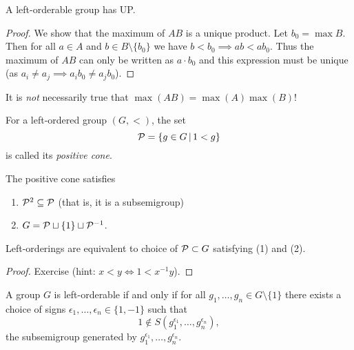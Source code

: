 \begin{proposition}
    A left-orderable group has UP.
\end{proposition}

\begin{proof}
    We show that the maximum of $AB$ is a unique product.
    Let $b_0 = \max B$.
    Then for all $a \in A$ and $b \in B \setminus \{b_0\}$ we have $b < b_0 \implies ab < ab_0$.
    Thus the maximum of $AB$ can only be written as $a \cdot b_0$ and this expression must be unique (as $a_i \neq a_j \implies a_i b_0 \neq a_j b_0$).
\end{proof}

\begin{remark}
    It is \emph{not} necessarily true that $\max(AB) = \max(A) \max(B)$!
\end{remark}

\begin{definition}
    For a left-ordered group $(G, <)$, the set \[
        \mathcal{P} = \left\{  g \in G  \,\middle|\,  1 < g  \right\}
    \] is called its \emph{positive cone}.
\end{definition}

The positive cone satisfies
\begin{enumerate}
    \item $\mathcal{P}^2 \subseteq \mathcal{P}$ (that is, it is a subsemigroup)
    \item $G = \mathcal{P} \sqcup \{1\} \sqcup \mathcal{P}^{-1}$.
\end{enumerate}

\begin{lemma}
    Left-orderings are equivalent to choice of $\mathcal{P} \subset G$ satisfying (1) and (2).
\end{lemma}

\begin{proof}
    Exercise (hint: $x < y \Leftrightarrow 1 < x^{-1} y$).
\end{proof}

\begin{lemma}
    A group $G$ is left-orderable if and only if for all $g_1, \dots, g_n \in G \setminus \{1\}$ there exists a choice of signs $\epsilon_1, \dots, \epsilon_n \in \{1, -1\}$ such that \[
        1 \notin S(g_1^{\epsilon_1}, \dots, g_n^{\epsilon_n}),
    \] the subsemigroup generated by $g_1^{\epsilon_1}, \dots, g_n^{\epsilon_n}$.
\end{lemma}

